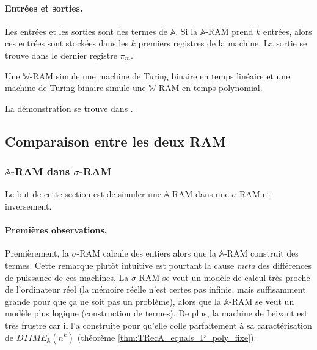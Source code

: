 \documentclass{report}
\newcommand{\bbA}{\mathbb{A}}
\begin{document}
		
			\paragraph{Entrées et sorties.}
			Les entrées et les sorties sont des termes de $\bbA$. Si la $\bbA$-RAM prend $k$ entrées, alors ces entrées sont stockées dans les $k$ premiers registres de la machine. La sortie se trouve dans le dernier registre $\pi_m$. 
		
		
		\begin{theorem}
			\label{thm:ARAMs_turing_complete}
			Une $\mathbb{W}$-RAM simule une machine de Turing binaire en temps linéaire et une machine de Turing binaire simule une $\mathbb{W}$-RAM en temps polynomial.
		\end{theorem}
			
		La démonstration se trouve dans \cite{Leivant1995}.
		
		
		
		
		\subsection{Comparaison entre les deux RAM}
		\label{subsec:comparaison_RAMs}

			
			\subsubsection{$\bbA$-RAM dans $\sigma$-RAM}
			\label{subsubsec:sim_A_RAM_sigma_RAM}
	
				Le but de cette section est de simuler une $\bbA$-RAM dans une $\sigma$-RAM et inversement.
				
				\paragraph{Premières observations.}
				\label{par:premieres_observations}
				Premièrement, la $\sigma$-RAM calcule des entiers alors que la $\bbA$-RAM construit des termes. Cette remarque plutôt intuitive est pourtant la cause \emph{meta} des différences de puissance de ces machines. La $\sigma$-RAM se veut un modèle de calcul très proche de l'ordinateur réel (la mémoire réelle n'est certes pas infinie, mais suffisamment grande pour que ça ne soit pas un problème), alors que la $\bbA$-RAM se veut un modèle plus logique (construction de termes). De plus, la machine de Leivant est très frustre car il l'a construite pour qu'elle colle parfaitement à sa caractérisation de $DTIME_{\bbA}(n^k)$ (théorème \ref{thm:TRecA_equals_P_poly_fixe}).
				
\end{document}
